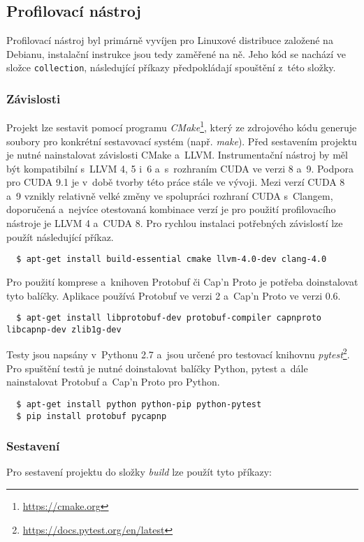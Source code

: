 \subsection{Profilovací nástroj}
Profilovací nástroj byl primárně vyvíjen pro Linuxové distribuce založené na Debianu, instalační instrukce jsou tedy zaměřené na ně. Jeho kód se nachází ve složce \texttt{collection}, následující příkazy předpokládají spouštění z~této složky. 

\subsubsection{Závislosti}
Projekt lze sestavit pomocí programu \emph{CMake}\footnote{\url{https://cmake.org}}, který ze zdrojového kódu generuje soubory pro konkrétní sestavovací systém (např. \emph{make}). Před sestavením projektu je nutné nainstalovat závislosti CMake a~LLVM. Instrumentační nástroj by měl být kompatibilní s~LLVM 4, 5 i~6 a~s~rozhraním CUDA ve verzi 8 a~9. Podpora pro CUDA 9.1 je v~době tvorby této práce stále ve vývoji.
Mezi verzí CUDA 8 a~9 vznikly relativně velké změny ve spolupráci rozhraní CUDA s~Clangem, doporučená a~nejvíce otestovaná kombinace verzí je pro použití profilovacího nástroje je LLVM 4 a~CUDA 8. Pro rychlou instalaci potřebných závislostí lze použít následující příkaz.
\begin{verbatim}
  $ apt-get install build-essential cmake llvm-4.0-dev clang-4.0
\end{verbatim}
Pro použití komprese a~knihoven Protobuf či Cap'n Proto je potřeba doinstalovat tyto balíčky. Aplikace používá Protobuf ve verzi 2 a~Cap'n Proto ve verzi 0.6.
\begin{verbatim}
  $ apt-get install libprotobuf-dev protobuf-compiler capnproto libcapnp-dev zlib1g-dev
\end{verbatim}
Testy jsou napsány v~Pythonu 2.7 a~jsou určené pro testovací knihovnu \emph{pytest}\footnote{\url{https://docs.pytest.org/en/latest}}. Pro spuštění testů je nutné doinstalovat balíčky Python, pytest a~dále nainstalovat Protobuf a~Cap'n Proto pro Python.
\begin{verbatim}
  $ apt-get install python python-pip python-pytest
  $ pip install protobuf pycapnp
\end{verbatim}

\subsubsection{Sestavení}
Pro sestavení projektu do složky \emph{build} lze použít tyto příkazy:

